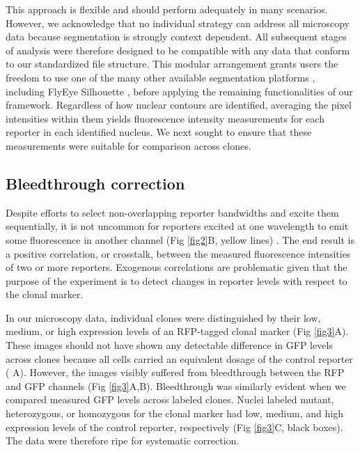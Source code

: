 \documentclass[10pt,letterpaper]{article}
\begin{document}
This approach is flexible and should perform adequately in many scenarios. However, we acknowledge that no individual strategy can address all microscopy data because segmentation is strongly context dependent. All subsequent stages of analysis were therefore designed to be compatible with any data that conform to our standardized file structure. This modular arrangement grants users the freedom to use one of the many other available segmentation platforms \cite{Bugarski2014}, including FlyEye Silhouette \cite{Pelaez2015a}, before applying the remaining functionalities of our framework. Regardless of how nuclear contours are identified, averaging the pixel intensities within them yields fluorescence intensity measurements for each reporter in each identified nucleus. We next sought to ensure that these measurements were suitable for comparison across clones.


\subsection*{Bleedthrough correction}
\label{ch:correction}

Despite efforts to select non-overlapping reporter bandwidths and excite them sequentially, it is not uncommon for reporters excited at one wavelength to emit some fluorescence in another channel (Fig \ref{fig2}B, yellow lines) \cite{Bacia2012,Zinchuk2007}. The end result is a positive correlation, or crosstalk, between the measured fluorescence intensities of two or more reporters. Exogenous correlations are problematic given that the purpose of the experiment is to detect changes in reporter levels with respect to the clonal marker.

In our microscopy data, individual clones were distinguished by their low, medium, or high expression levels of an RFP-tagged clonal marker (Fig \ref{fig3}A). These images should not have shown any detectable difference in GFP levels across clones because all cells carried an equivalent dosage of the control reporter ( A). However, the images visibly suffered from bleedthrough between the RFP and GFP channels (Fig \ref{fig3}A,B). Bleedthrough was similarly evident when we compared measured GFP levels across labeled clones. Nuclei labeled mutant, heterozygous, or homozygous for the clonal marker had low, medium, and high expression levels of the control reporter, respectively (Fig \ref{fig3}C, black boxes). The data were therefore ripe for systematic correction.
\end{document}
